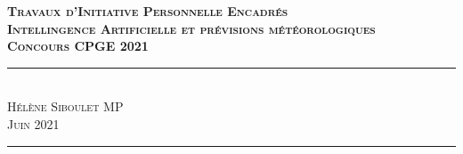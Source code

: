 \documentclass[11pt,a4paper]{article}
\begin{document}
\begin{flushleft}
\Large \textcolor{BrickRed}{\textsc{\textbf{Travaux d'Initiative Personnelle Encadrés}}} \\
\Huge \textcolor{BrickRed}{\textsc{\textbf{Intellingence Artificielle et prévisions météorologiques }}} \\[0.5cm]
\Large \textcolor{BrickRed}{\textsc{\textbf{Concours CPGE 2021 \\[0.5 cm]}}}
\hrule \textcolor{White}{-} \\[0.1cm]
\Large \textsc{Hélène Siboulet MP} \\
\Large \textsc{Juin 2021} \\[0.5cm]
\hrule
\end{flushleft}
\end{document}
